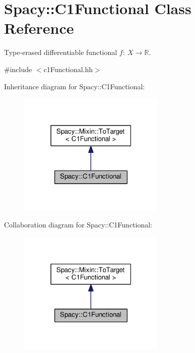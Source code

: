 \hypertarget{classSpacy_1_1C1Functional}{}\section{Spacy\+:\+:C1\+Functional Class Reference}
\label{classSpacy_1_1C1Functional}


Type-\/erased differentiable functional $f:\ X \to \mathbb{R} $.  




{\ttfamily \#include $<$c1\+Functional.\+hh$>$}



Inheritance diagram for Spacy\+:\+:C1\+Functional\+:\nopagebreak
\begin{figure}[H]
\begin{center}
\leavevmode
\includegraphics[width=199pt]{classSpacy_1_1C1Functional__inherit__graph}
\end{center}
\end{figure}


Collaboration diagram for Spacy\+:\+:C1\+Functional\+:\nopagebreak
\begin{figure}[H]
\begin{center}
\leavevmode
\includegraphics[width=199pt]{classSpacy_1_1C1Functional__coll__graph}
\end{center}
\end{figure}
